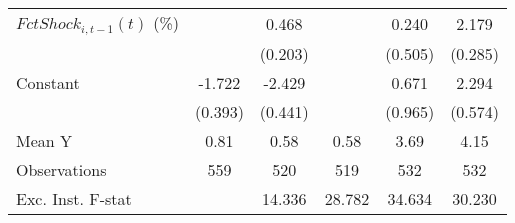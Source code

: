 {\begin{tabular}{l*{5}{c}}
\addlinespace
$ FctShock_{i,t-1}(t)$ (\%)&                     &       0.468\sym{**} &                     &       0.240         &       2.179\sym{***}\\
                    &                     &     (0.203)         &                     &     (0.505)         &     (0.285)         \\
\addlinespace
Constant            &      -1.722\sym{***}&      -2.429\sym{***}&                     &       0.671         &       2.294\sym{***}\\
                    &     (0.393)         &     (0.441)         &                     &     (0.965)         &     (0.574)         \\
\midrule
Mean Y              &        0.81         &        0.58         &        0.58         &        3.69         &        4.15         \\
Observations        &         559         &         520         &         519         &         532         &         532         \\
Exc. Inst. F-stat   &                     &      14.336         &      28.782         &      34.634         &      30.230         \\
\bottomrule
\end{tabular}
}
